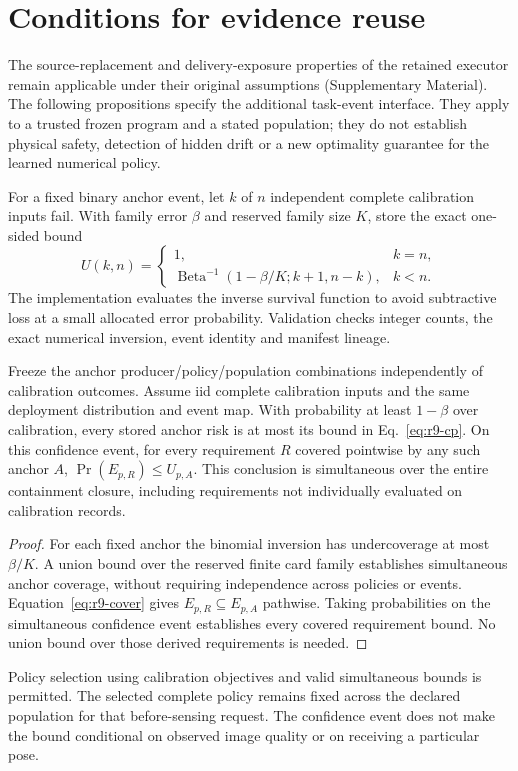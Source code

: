 \section{Conditions for evidence reuse}\label{sec:r9-theory}
The source-replacement and delivery-exposure properties of the retained executor remain applicable under their original assumptions (Supplementary Material). The following propositions specify the additional task-event interface. They apply to a trusted frozen program and a stated population; they do not establish physical safety, detection of hidden drift or a new optimality guarantee for the learned numerical policy.

For a fixed binary anchor event, let $k$ of $n$ independent complete calibration inputs fail. With family error $\beta$ and reserved family size $K$, store the exact one-sided bound \cite{clopper1934}
\begin{equation}
U(k,n)=\begin{cases}1,&k=n,\\
\operatorname{Beta}^{-1}(1-\beta/K;k+1,n-k),&k<n.
\end{cases}\label{eq:r9-cp}
\end{equation}
The implementation evaluates the inverse survival function to avoid subtractive loss at a small allocated error probability. Validation checks integer counts, the exact numerical inversion, event identity and manifest lineage.

\begin{proposition}\label{prop:r9-closure}
Freeze the anchor producer/policy/population combinations independently of calibration outcomes. Assume iid complete calibration inputs and the same deployment distribution and event map. With probability at least $1-\beta$ over calibration, every stored anchor risk is at most its bound in Eq.~\eqref{eq:r9-cp}. On this confidence event, for every requirement $R$ covered pointwise by any such anchor $A$, $\Pr(E_{p,R})\le U_{p,A}$. This conclusion is simultaneous over the entire containment closure, including requirements not individually evaluated on calibration records.
\end{proposition}
\begin{proof}
For each fixed anchor the binomial inversion has undercoverage at most $\beta/K$. A union bound over the reserved finite card family establishes simultaneous anchor coverage, without requiring independence across policies or events. Equation~\eqref{eq:r9-cover} gives $E_{p,R}\subseteq E_{p,A}$ pathwise. Taking probabilities on the simultaneous confidence event establishes every covered requirement bound. No union bound over those derived requirements is needed.
\end{proof}
Policy selection using calibration objectives and valid simultaneous bounds is permitted. The selected complete policy remains fixed across the declared population for that before-sensing request. The confidence event does not make the bound conditional on observed image quality or on receiving a particular pose.

